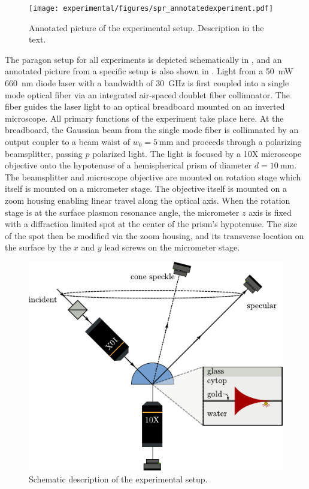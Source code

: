 \begin{figure}[ht]
 \centering
 \texttt{[image: experimental/figures/spr\_annotatedexperiment.pdf]}
 \caption{Annotated picture of the experimental setup.  Description in the
	text.}
 \label{fig:experimentalpicture}
\end{figure}

The paragon setup for all experiments is depicted schematically in
, and an annotated picture from a specific
setup is also shown in .  Light from a
\SI{50}{\milli\watt} \SI{660}{\nano\meter} diode laser with a bandwidth of
\SI{30}{\giga\hertz} is first coupled into a single mode optical fiber via
an integrated air-spaced doublet fiber collimnator.  The fiber guides the
laser light to an optical breadboard mounted on an inverted microscope.
All primary functions of the experiment take place here.  At the
breadboard, the Gaussian beam from the single mode fiber is collimnated by
an output coupler to a beam waist of $w_0=\SI{5}{\milli\meter}$ and
proceeds through a polarizing beamsplitter, passing $p$ polarized light.
The light is focused by a 10X microscope objective onto the hypotenuse of a
hemispherical prism of diameter $d=\SI{10}{\milli\meter}$.  The
beamsplitter and microscope objective are mounted on rotation stage which
itself is mounted on a micrometer stage.  The objective itself is mounted
on a zoom housing enabling linear travel along the optical axis.  When the
rotation stage is at the surface plasmon resonance angle, the micrometer
$z$ axis is fixed with a diffraction limited spot at the center of the
prism's hypotenuse.  The size of the spot then be modified via the zoom
housing, and its transverse location on the surface by the $x$ and $y$ lead
screws on the micrometer stage.  

\begin{figure}[ht]
\centering
 \includegraphics[keepaspectratio]{experimental/figures/conefig.pdf}
	\caption{Schematic description of the experimental setup.}
 \label{fig:experimentalsetup}
\end{figure}

